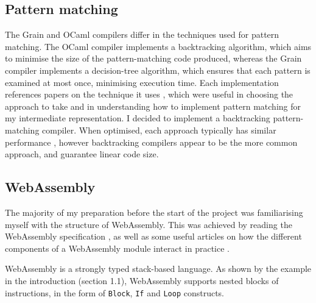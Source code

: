 
\subsection{Pattern matching}

The Grain and OCaml compilers differ in the techniques used for pattern matching.  The OCaml compiler implements a backtracking algorithm, which aims to minimise the size of the pattern-matching code produced, whereas the Grain compiler implements a decision-tree algorithm, which ensures that each pattern is examined at most once, minimising execution time. Each implementation references papers on the technique it uses \cite{ocamlpatternmatch, decisiontrees}, which were useful in choosing the approach to take and in understanding how to implement pattern matching for my intermediate representation.
%
I decided to implement a backtracking pattern-matching compiler.  When optimised, each approach typically has similar performance \cite{decisiontrees}, however backtracking compilers appear to be the more common approach, and guarantee linear code size.


\subsection{WebAssembly}
The majority of my preparation before the start of the project was familiarising myself with the structure of WebAssembly.
This was achieved by reading the WebAssembly specification \cite{wasm}, as well as some useful articles on how the different components of a WebAssembly module interact in practice \cite{wasm-article}.

WebAssembly is a strongly typed stack-based language. %
As shown by the example in the introduction (section 1.1), WebAssembly supports nested blocks of instructions, in the form of \verb|Block|, \verb|If| and \verb|Loop| constructs. 

